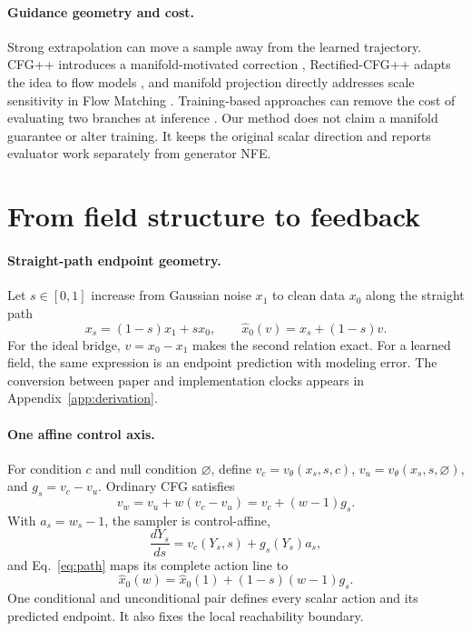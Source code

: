 \documentclass[10pt,twocolumn,letterpaper]{article}
\begin{document}
\paragraph{Guidance geometry and cost.}
Strong extrapolation can move a sample away from the learned trajectory.
CFG++ introduces a manifold-motivated correction \cite{chung2024cfgpp},
Rectified-CFG++ adapts the idea to flow models \cite{saini2025rectifiedcfgpp},
and manifold projection directly addresses scale sensitivity in Flow Matching
\cite{cai2026improving}. Training-based approaches can remove the cost of
evaluating two branches at inference \cite{tang2025diffusion}. Our method does
not claim a manifold guarantee or alter training. It keeps the original scalar
direction and reports evaluator work separately from generator NFE.

\section{From field structure to feedback}
\label{sec:problem}

\paragraph{Straight-path endpoint geometry.}
Let $s\in[0,1]$ increase from Gaussian noise $x_1$ to clean data $x_0$ along
the straight path
\begin{equation}
    x_s=(1-s)x_1+s x_0,\qquad
    \hat{x}_0(v)=x_s+(1-s)v.
    \label{eq:path}
\end{equation}
For the ideal bridge, $v=x_0-x_1$ makes the second relation exact. For a
learned field, the same expression is an endpoint prediction with modeling
error. The conversion between paper and implementation clocks appears in
Appendix~\ref{app:derivation}.

\paragraph{One affine control axis.}
For condition $c$ and null condition $\varnothing$, define
$v_c=v_\theta(x_s,s,c)$, $v_u=v_\theta(x_s,s,\varnothing)$, and
$g_s=v_c-v_u$. Ordinary CFG satisfies
\begin{equation}
    v_w=v_u+w(v_c-v_u)=v_c+(w-1)g_s.
    \label{eq:cfg}
\end{equation}
With $a_s=w_s-1$, the sampler is control-affine,
\begin{equation}
    \frac{dY_s}{ds}=v_c(Y_s,s)+g_s(Y_s)a_s,
    \label{eq:control-affine}
\end{equation}
and Eq.~\eqref{eq:path} maps its complete action line to
\begin{equation}
    \hat{x}_0(w)=\hat{x}_0(1)+(1-s)(w-1)g_s.
    \label{eq:endpoint-locus}
\end{equation}
One conditional and unconditional pair defines every scalar action and its
predicted endpoint. It also fixes the local reachability boundary.
\end{document}
